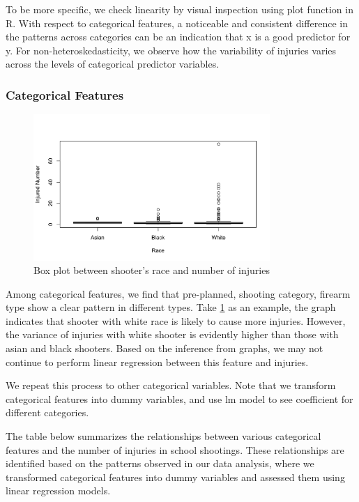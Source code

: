 \documentclass[12pt]{article}
\numberwithin{figure}{section}
\begin{document}
To be more specific, we check linearity by visual inspection using plot function in R. With respect to categorical features, a noticeable and consistent difference in the patterns across categories can be an indication that x is a good predictor for y. For non-heteroskedasticity, we observe how the variability of injuries varies across the levels of  categorical predictor variables.

\subsubsection{Categorical Features}

\begin{figure}[H]
    \centering
    \includegraphics[width=0.8\textwidth]{lm_race_box.png}
    \caption{Box plot between shooter's race and number of injuries}
    \label{lm_race_box}
\end{figure}

Among categorical features, we find that pre-planned, shooting category, firearm type show a clear pattern in different types. Take \ref{lm_race_box} as an example, the graph indicates that shooter with white race is likely to cause more injuries. However, the variance of injuries with white shooter is evidently higher than those with asian and black shooters. Based on the inference from graphs, we may not continue to perform linear regression between this feature and injuries. 

We repeat this process to other categorical variables. Note that we transform categorical features into dummy variables, and use lm model to see coefficient for different categories.

The table below summarizes the relationships between various categorical features and the number of injuries in school shootings. These relationships are identified based on the patterns observed in our data analysis, where we transformed categorical features into dummy variables and assessed them using linear regression models.
\end{document}
